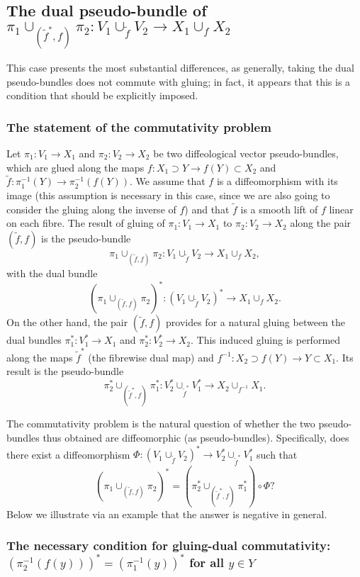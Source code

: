 \documentclass{article}
\begin{document}
\subsection{The dual pseudo-bundle of $\pi_1\cup_{(\tilde{f}^*,f)}\pi_2:V_1\cup_{\tilde{f}}V_2\to X_1\cup_f X_2$}

This case presents the most substantial differences, as generally, taking the dual pseudo-bundles does not commute with gluing; in fact, it appears that this is a condition that should be explicitly imposed.

\subsubsection{The statement of the commutativity problem}

Let $\pi_1:V_1\to X_1$ and $\pi_2:V_2\to X_2$ be two diffeological vector pseudo-bundles, which are glued along the maps $f:X_1\supset Y\to f(Y)\subset X_2$ and $\tilde{f}:\pi_1^{-1}(Y)\to\pi_2^{-1}(f(Y))$. 
We assume that $f$ is a diffeomorphism with its image (this assumption is necessary in this case, since we are also going to consider the gluing along the inverse of $f$) and that $\tilde{f}$ is a smooth lift of 
$f$ linear on each fibre. The result of gluing of $\pi_1:V_1\to X_1$ to $\pi_2:V_2\to X_2$ along the pair $(\tilde{f},f)$ is the pseudo-bundle
$$\pi_1\cup_{(\tilde{f},f)}\pi_2:V_1\cup_{\tilde{f}}V_2\to X_1\cup_f X_2,$$ with the dual bundle
$$(\pi_1\cup_{(\tilde{f},f)}\pi_2)^*:(V_1\cup_{\tilde{f}}V_2)^*\to X_1\cup_f X_2.$$
On the other hand, the pair $(\tilde{f},f)$ provides for a natural gluing between the dual bundles $\pi_1^*:V_1^*\to X_1$ and $\pi_2^*:V_2^*\to X_2$. This induced gluing is performed along the maps 
$\tilde{f}^*$ (the fibrewise dual map) and $f^{-1}:X_2\supset f(Y)\to Y\subset X_1$. Its result is the pseudo-bundle
$$\pi_2^*\cup_{(\tilde{f}^*,f)}\pi_1^*:V_2^*\cup_{\tilde{f}^*}V_1^*\to X_2\cup_{f^{-1}}X_1.$$

The commutativity problem is the natural question of whether the two pseudo-bundles thus obtained are diffeomorphic (as pseudo-bundles). Specifically, does there exist a diffeomorphism
$\Phi:(V_1\cup_{\tilde{f}}V_2)^*\to V_2^*\cup_{\tilde{f}^*}V_1^*$ such that
$$(\pi_1\cup_{(\tilde{f},f)}\pi_2)^*=\left(\pi_2^*\cup_{(\tilde{f}^*,f)}\pi_1^*\right)\circ\Phi?$$ Below we illustrate via an example that the answer is negative in general.


\subsubsection{The necessary condition for gluing-dual commutativity: $(\pi_2^{-1}(f(y)))^*=(\pi_1^{-1}(y))^*$ for all $y\in Y$}
\end{document}
